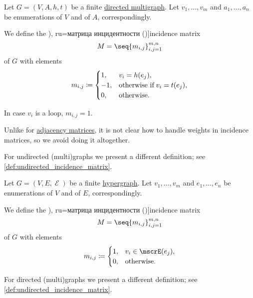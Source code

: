 \begin{definition}\label{def:directed_incidence_matrix}
  Let \( G = (V, A, h, t) \) be a finite \hyperref[def:directed_multigraph]{directed multigraph}. Let \( v_1, \ldots, v_m \) and \( a_1, \ldots, a_n \) be enumerations of \( V \) and of \( A \), correspondingly.

  We define the \term[bg=матрица на инцидентност (\cite[47]{Мирчев2001Графи}), ru=матрица инцидентности (\cite[289]{БелоусовТкачёв2004ДискретнаяМатематика})]{incidence matrix}
  \begin{equation*}
    M = \seq{ m_{i,j} }_{i,j=1}^{m,n}
  \end{equation*}
  of \( G \) with elements
  \begin{equation*}
    m_{i,j} \coloneqq \begin{cases}
      1,  &v_i = h(e_j), \\
      -1, &\T{otherwise if} v_i = t(e_j), \\
      0,  &\T{otherwise.}
    \end{cases}
  \end{equation*}

  In case \( v_i \) is a loop, \( m_{i,j} = 1 \).
\end{definition}
\begin{comments}
  \item Unlike for \hyperref[def:graph_adjacency_matrix]{adjacency matrices}, it is not clear how to handle weights in incidence matrices, so we avoid doing it altogether.
  \item For undirected (multi)graphs we present a different definition; see \cref{def:undirected_incidence_matrix}.
\end{comments}

\begin{definition}\label{def:undirected_incidence_matrix}
  Let \( G = (V, E, \mscrE) \) be a finite \hyperref[def:hypergraph]{hypergraph}. Let \( v_1, \ldots, v_m \) and \( e_1, \ldots, e_n \) be enumerations of \( V \) and of \( E \), correspondingly.

  We define the \term[bg=матрица на инцидентност (\cite[47]{Мирчев2001Графи}), ru=матрица инцидентности (\cite[288]{БелоусовТкачёв2004ДискретнаяМатематика})]{incidence matrix}
  \begin{equation*}
    M = \seq{ m_{i,j} }_{i,j=1}^{m,n}
  \end{equation*}
  of \( G \) with elements
  \begin{equation*}
    m_{i,j} \coloneqq \begin{cases}
      1,  &v_i \in \mscrE(e_j), \\
      0,  &\T{otherwise.}
    \end{cases}
  \end{equation*}
\end{definition}
\begin{comments}
  \item For directed (multi)graphs we present a different definition; see \cref{def:undirected_incidence_matrix}.
\end{comments}

